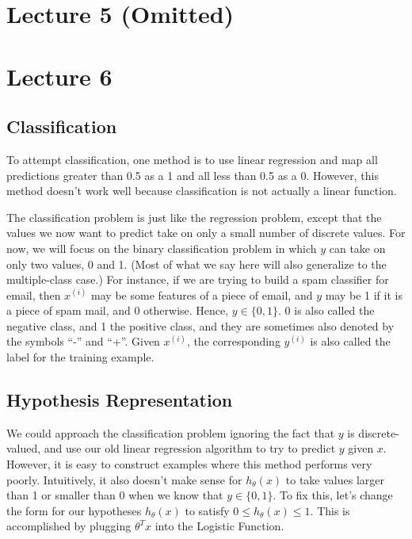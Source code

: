 \documentclass[UTF8]{article}
\begin{document}
\section{Lecture 5 (Omitted)}

\section{Lecture 6}

\subsection{Classification}

To attempt classification, one method is to use linear regression and map all predictions greater than 0.5 as a 1 and all less than 0.5 as a 0. However, this method doesn't work well because classification is not actually a linear function.

The classification problem is just like the regression problem, except that the values we now want to predict take on only a small number of discrete values. For now, we will focus on the binary classification problem in which $y$ can take on only two values, 0 and 1. (Most of what we say here will also generalize to the multiple-class case.) For instance, if we are trying to build a spam classifier for email, then $x^{(i)}$ may be some features of a piece of email, and $y$ may be 1 if it is a piece of spam mail, and 0 otherwise. Hence, $y\in\{0,1\}$. 0 is also called the negative class, and 1 the positive class, and they are sometimes also denoted by the symbols ``-'' and ``+''. Given $x^{(i)}$, the corresponding $y^{(i)}$ is also called the label for the training example.

\subsection{Hypothesis Representation}

We could approach the classification problem ignoring the fact that $y$ is discrete-valued, and use our old linear regression algorithm to try to predict $y$ given $x$. However, it is easy to construct examples where this method performs very poorly. Intuitively, it also doesn't make sense for $h_\theta(x)$ to take values larger than 1 or smaller than 0 when we know that $y\in\{0, 1\}$. To fix this, let's change the form for our hypotheses $h_\theta(x)$ to satisfy $0\le h_\theta(x) \le 1$. This is accomplished by plugging $\theta^Tx$ into the Logistic Function.
\end{document}
